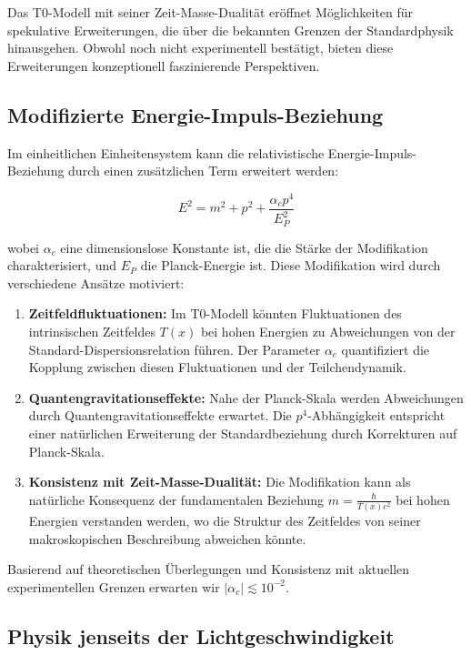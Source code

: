 \documentclass[12pt,a4paper]{article}
\newcommand{\Tfield}{T(x)}
\begin{document}
	Das T0-Modell mit seiner Zeit-Masse-Dualität eröffnet Möglichkeiten für spekulative Erweiterungen, die über die bekannten Grenzen der Standardphysik hinausgehen. Obwohl noch nicht experimentell bestätigt, bieten diese Erweiterungen konzeptionell faszinierende Perspektiven.
	
	\subsection{Modifizierte Energie-Impuls-Beziehung}
	\label{subsec:modified_energy_momentum}
	
	Im einheitlichen Einheitensystem kann die relativistische Energie-Impuls-Beziehung durch einen zusätzlichen Term erweitert werden:
	
	\begin{equation}
		\label{eq:modified_energy_momentum}
		E^2 = m^2 + p^2 + \frac{\alpha_c p^4}{E_P^2}
	\end{equation}
	
	wobei \(\alpha_c\) eine dimensionslose Konstante ist, die die Stärke der Modifikation charakterisiert, und \(E_P\) die Planck-Energie ist. Diese Modifikation wird durch verschiedene Ansätze motiviert:
	
	\begin{enumerate}
		\item \textbf{Zeitfeldfluktuationen:} Im T0-Modell könnten Fluktuationen des intrinsischen Zeitfeldes \(\Tfield\) bei hohen Energien zu Abweichungen von der Standard-Dispersionsrelation führen. Der Parameter \(\alpha_c\) quantifiziert die Kopplung zwischen diesen Fluktuationen und der Teilchendynamik.
		\item \textbf{Quantengravitationseffekte:} Nahe der Planck-Skala werden Abweichungen durch Quantengravitationseffekte erwartet. Die \(p^4\)-Abhängigkeit entspricht einer natürlichen Erweiterung der Standardbeziehung durch Korrekturen auf Planck-Skala.
		\item \textbf{Konsistenz mit Zeit-Masse-Dualität:} Die Modifikation kann als natürliche Konsequenz der fundamentalen Beziehung \(m = \frac{\hbar}{\Tfield c^2}\) bei hohen Energien verstanden werden, wo die Struktur des Zeitfeldes von seiner makroskopischen Beschreibung abweichen könnte.
	\end{enumerate}
	
	Basierend auf theoretischen Überlegungen und Konsistenz mit aktuellen experimentellen Grenzen erwarten wir \(|\alpha_c| \lesssim 10^{-2}\).
	
	\subsection{Physik jenseits der Lichtgeschwindigkeit}
	\label{subsec:beyond_c}
	
\end{document}
